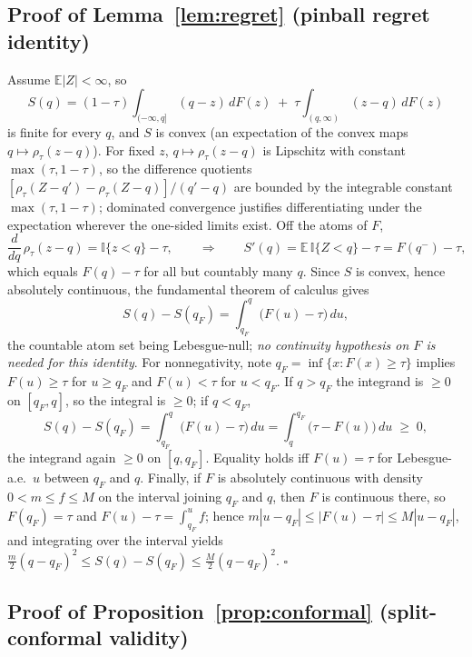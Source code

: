 \documentclass[11pt]{article}
\theoremstyle{remark}
\begin{document}
\subsection*{Proof of Lemma~\ref{lem:regret} (pinball regret identity)}

Assume $\mathbb{E}|Z|<\infty$, so
\[
S(q) = (1-\tau)\!\int_{(-\infty,q]}\!(q-z)\,dF(z)
\;+\; \tau\!\int_{(q,\infty)}\!(z-q)\,dF(z)
\]
is finite for every $q$, and $S$ is convex (an expectation of the
convex maps $q\mapsto\rho_\tau(z-q)$). For fixed $z$, $q\mapsto
\rho_\tau(z-q)$ is Lipschitz with constant $\max(\tau,1-\tau)$, so the
difference quotients $[\rho_\tau(Z-q')-\rho_\tau(Z-q)]/(q'-q)$ are
bounded by the integrable constant $\max(\tau,1-\tau)$; dominated
convergence justifies differentiating under the expectation wherever the
one-sided limits exist. Off the atoms of $F$,
\[
\frac{d}{dq}\,\rho_\tau(z-q) = \mathbb{I}\{z<q\}-\tau ,
\qquad\Longrightarrow\qquad
S'(q) = \mathbb{E}\,\mathbb{I}\{Z<q\}-\tau = F(q^-)-\tau,
\]
which equals $F(q)-\tau$ for all but countably many $q$. Since $S$ is
convex, hence absolutely continuous, the fundamental theorem of
calculus gives
\[
S(q)-S(q_F)=\int_{q_F}^{q}\big(F(u)-\tau\big)\,du,
\]
the countable atom set being Lebesgue-null; \emph{no continuity
hypothesis on $F$ is needed for this identity}. For nonnegativity,
note $q_F=\inf\{x:F(x)\ge\tau\}$ implies $F(u)\ge\tau$ for $u\ge q_F$
and $F(u)<\tau$ for $u<q_F$. If $q>q_F$ the integrand is $\ge0$ on
$[q_F,q]$, so the integral is $\ge0$; if $q<q_F$,
\[
S(q)-S(q_F)=\int_{q_F}^{q}\big(F(u)-\tau\big)\,du
=\int_{q}^{q_F}\big(\tau-F(u)\big)\,du\;\ge\;0 ,
\]
the integrand again $\ge0$ on $[q,q_F]$. Equality holds iff $F(u)=\tau$
for Lebesgue-a.e.\ $u$ between $q_F$ and $q$. Finally, if $F$ is
absolutely continuous with density $0<m\le f\le M$ on the interval
joining $q_F$ and $q$, then $F$ is continuous there, so $F(q_F)=\tau$
and $F(u)-\tau=\int_{q_F}^{u}f$; hence $m|u-q_F|\le|F(u)-\tau|\le
M|u-q_F|$, and integrating over the interval yields
$\tfrac{m}{2}(q-q_F)^2\le S(q)-S(q_F)\le\tfrac{M}{2}(q-q_F)^2$.
\hfill$\square$

\subsection*{Proof of Proposition~\ref{prop:conformal} (split-conformal
validity)}
\end{document}
